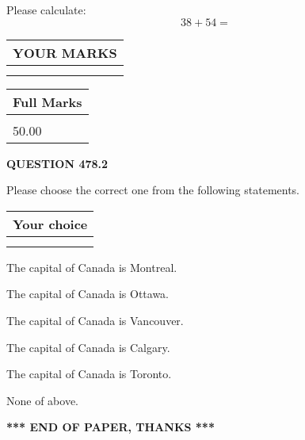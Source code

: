 \documentclass[12pt]{article}
\begin{document}
  
 
Please calculate:
\begin{equation}
38 +  %
54 = \nonumber
\end{equation}
 

 

 
  
\vspace{0.2in}
  
\noindent\begin{tabular}{|l|}
\hline
 YOUR MARKS  \\
\hline
 \\ 
 \\ 
\hline
\end{tabular}
\hspace{0.05in} \begin{tabular}{|l|}
\hline
 Full Marks  \\
\hline
 \\ 
50.00 \\
\hline
\end{tabular}
{\textbf{\Large{QUESTION
478.2 
}}}
  
  
Please choose the correct one from the following statements.
  
  
\noindent\hspace{3.0in} \begin{tabular}{|l|}
\hline
Your choice \\
\hline
 \\ 
 \\ 
\hline
\end{tabular}
  
  
 
 
The capital of Canada is Montreal.
 
 
The capital of Canada is Ottawa.
 
 
The capital of Canada is Vancouver.
 
 
The capital of Canada is Calgary.
 
 
The capital of Canada is Toronto.
 
 
 None of above.
 
 
   
   
 \vspace{0.2in}
 
   
   
   
   
\vspace{1.0in} 
{\textbf{\large{ *** END OF PAPER, THANKS *** }}} 
   
\end{document}
